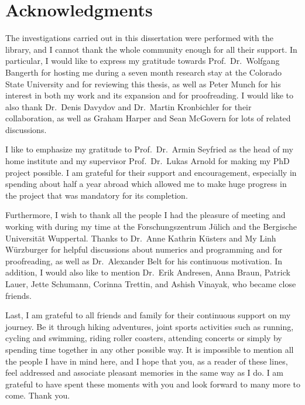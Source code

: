 \section*{\centering Acknowledgments}

The investigations carried out in this dissertation were performed with the \dealii{} library, and I cannot thank the whole \dealii{} community enough for all their support. In particular, I would like to express my gratitude towards Prof.\ Dr.\ Wolfgang Bangerth for hosting me during a seven month research stay at the Colorado State University and for reviewing this thesis, as well as Peter Munch for his interest in both my work and its expansion and for proofreading. I would like to also thank Dr.\ Denis Davydov and Dr.\ Martin Kronbichler for their collaboration, as well as Graham Harper and Sean McGovern for lots of \dealii{} related discussions.

I like to emphasize my gratitude to Prof.\ Dr.\ Armin Seyfried as the head of my home institute and my supervisor Prof.\ Dr.\ Lukas Arnold for making my PhD project possible. I am grateful for their support and encouragement, especially in spending about half a year abroad which allowed me to make huge progress in the project that was mandatory for its completion.

Furthermore, I wish to thank all the people I had the pleasure of meeting and working with during my time at the Forschungszentrum Jülich and the Bergische Universität Wuppertal. Thanks to Dr.\ Anne Kathrin Küsters and My Linh Würzburger for helpful discussions about numerics and programming and for proofreading, as well as Dr.\ Alexander Belt for his continuous motivation. In addition, I would also like to mention Dr.\ Erik Andresen, Anna Braun, Patrick Lauer, Jette Schumann, Corinna Trettin, and Ashish Vinayak, who became close friends.

Last, I am grateful to all friends and family for their continuous support on my journey. Be it through hiking adventures, joint sports activities such as running, cycling and swimming, riding roller coasters, attending concerts or simply by spending time together in any other possible way. It is impossible to mention all the people I have in mind here, and I hope that you, as a reader of these lines, feel addressed and associate pleasant memories in the same way as I do. I am grateful to have spent these moments with you and look forward to many more to come. Thank you.
